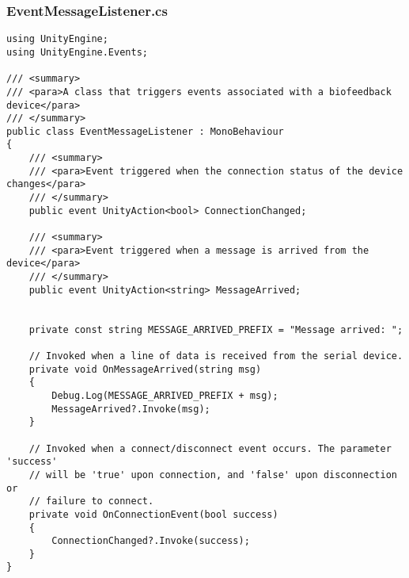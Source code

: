 \subsubsection*{EventMessageListener.cs}
\begin{verbatim}
using UnityEngine;
using UnityEngine.Events;

/// <summary>
/// <para>A class that triggers events associated with a biofeedback device</para>
/// </summary>
public class EventMessageListener : MonoBehaviour
{
    /// <summary>
    /// <para>Event triggered when the connection status of the device changes</para>
    /// </summary>
    public event UnityAction<bool> ConnectionChanged;

    /// <summary>
    /// <para>Event triggered when a message is arrived from the device</para>
    /// </summary>
    public event UnityAction<string> MessageArrived;


    private const string MESSAGE_ARRIVED_PREFIX = "Message arrived: ";

    // Invoked when a line of data is received from the serial device.
    private void OnMessageArrived(string msg)
    {
        Debug.Log(MESSAGE_ARRIVED_PREFIX + msg);
        MessageArrived?.Invoke(msg);
    }

    // Invoked when a connect/disconnect event occurs. The parameter 'success'
    // will be 'true' upon connection, and 'false' upon disconnection or
    // failure to connect.
    private void OnConnectionEvent(bool success)
    {
        ConnectionChanged?.Invoke(success);
    }
}
\end{verbatim}
